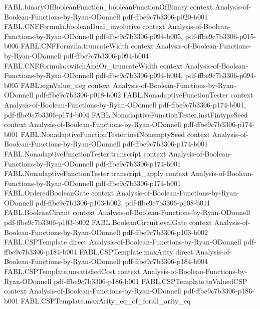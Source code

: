\begin{theorem}
  {FABL.binaryOfBooleanFunction_booleanFunctionOfBinary}
  {context}
  {Analysis-of-Boolean-Functions-by-Ryan-ODonnell}
  {pdf-ffbe9c7b3306-p020-b001}
\proofstep
  {FABL.CNFFormula.booleanDual_involutive}
  {context}
  {Analysis-of-Boolean-Functions-by-Ryan-ODonnell}
  {pdf-ffbe9c7b3306-p094-b005,
    pdf-ffbe9c7b3306-p015-b006}
\proofstep
  {FABL.CNFFormula.truncateWidth}
  {context}
  {Analysis-of-Boolean-Functions-by-Ryan-ODonnell}
  {pdf-ffbe9c7b3306-p094-b004}
\proofstep
  {FABL.CNFFormula.switchAndOr_truncateWidth}
  {context}
  {Analysis-of-Boolean-Functions-by-Ryan-ODonnell}
  {pdf-ffbe9c7b3306-p094-b004,
    pdf-ffbe9c7b3306-p094-b005}
\proofstep
  {FABL.signValue_neg}
  {context}
  {Analysis-of-Boolean-Functions-by-Ryan-ODonnell}
  {pdf-ffbe9c7b3306-p018-b002}
\proofstep
  {FABL.NonadaptiveFunctionTester}
  {context}
  {Analysis-of-Boolean-Functions-by-Ryan-ODonnell}
  {pdf-ffbe9c7b3306-p174-b001,
    pdf-ffbe9c7b3306-p174-b004}
\proofstep
  {FABL.NonadaptiveFunctionTester.instFintypeSeed}
  {context}
  {Analysis-of-Boolean-Functions-by-Ryan-ODonnell}
  {pdf-ffbe9c7b3306-p174-b001}
\proofstep
  {FABL.NonadaptiveFunctionTester.instNonemptySeed}
  {context}
  {Analysis-of-Boolean-Functions-by-Ryan-ODonnell}
  {pdf-ffbe9c7b3306-p174-b001}
\proofstep
  {FABL.NonadaptiveFunctionTester.transcript}
  {context}
  {Analysis-of-Boolean-Functions-by-Ryan-ODonnell}
  {pdf-ffbe9c7b3306-p174-b001}
\proofstep
  {FABL.NonadaptiveFunctionTester.transcript_apply}
  {context}
  {Analysis-of-Boolean-Functions-by-Ryan-ODonnell}
  {pdf-ffbe9c7b3306-p174-b001}
\proofstep
  {FABL.OrderedBooleanGate}
  {context}
  {Analysis-of-Boolean-Functions-by-Ryan-ODonnell}
  {pdf-ffbe9c7b3306-p103-b002,
    pdf-ffbe9c7b3306-p108-b011}
\proofstep
  {FABL.BooleanCircuit}
  {context}
  {Analysis-of-Boolean-Functions-by-Ryan-ODonnell}
  {pdf-ffbe9c7b3306-p103-b002}
\proofstep
  {FABL.BooleanCircuit.evalGate}
  {context}
  {Analysis-of-Boolean-Functions-by-Ryan-ODonnell}
  {pdf-ffbe9c7b3306-p103-b002}
\proofstep
  {FABL.CSPTemplate}
  {direct}
  {Analysis-of-Boolean-Functions-by-Ryan-ODonnell}
  {pdf-ffbe9c7b3306-p184-b004}
\proofstep
  {FABL.CSPTemplate.maxArity}
  {direct}
  {Analysis-of-Boolean-Functions-by-Ryan-ODonnell}
  {pdf-ffbe9c7b3306-p184-b004}
\proofstep
  {FABL.CSPTemplate.unsatisfiedCost}
  {context}
  {Analysis-of-Boolean-Functions-by-Ryan-ODonnell}
  {pdf-ffbe9c7b3306-p186-b001}
\proofstep
  {FABL.CSPTemplate.toValuedCSP}
  {context}
  {Analysis-of-Boolean-Functions-by-Ryan-ODonnell}
  {pdf-ffbe9c7b3306-p186-b001}
\proofstep
  {FABL.CSPTemplate.maxArity_eq_of_forall_arity_eq}

\end{theorem}

